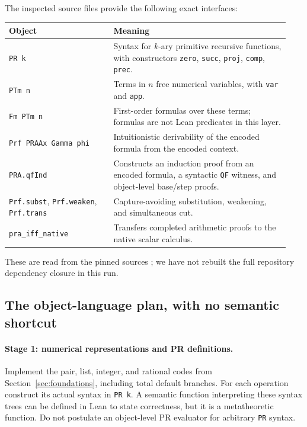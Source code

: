 The inspected source files provide the following exact interfaces:
\begin{longtable}{@{}>{\raggedright\arraybackslash}p{0.35\linewidth}>{\raggedright\arraybackslash}p{0.59\linewidth}@{}}
\toprule
Object & Meaning\\
\midrule
\endhead
\texttt{PR k} & Syntax for $k$-ary primitive recursive functions,
with constructors \texttt{zero}, \texttt{succ}, \texttt{proj},
\texttt{comp}, \texttt{prec}.\\
\texttt{PTm n} & Terms in $n$ free numerical variables, with
\texttt{var} and \texttt{app}.\\
\texttt{Fm PTm n} & First-order formulas over these terms; formulas
are not Lean predicates in this layer.\\
\texttt{Prf PRAAx Gamma phi} & Intuitionistic derivability of the
encoded formula from the encoded context.\\
\texttt{PRA.qfInd} & Constructs an induction proof from an encoded
formula, a syntactic \texttt{QF} witness, and object-level base/step proofs.\\
\texttt{Prf.subst}, \texttt{Prf.weaken}, \texttt{Prf.trans} &
Capture-avoiding substitution, weakening, and simultaneous cut.\\
\texttt{pra\_iff\_native} & Transfers completed arithmetic proofs to
the native scalar calculus.\\
\bottomrule
\end{longtable}
These are read from the pinned sources \cite{repo-pr,repo-deduction,repo-native};
we have not rebuilt the full repository dependency closure in this run.

\subsection{The object-language plan, with no semantic shortcut}

\paragraph{Stage 1: numerical representations and PR definitions.}
Implement the pair, list, integer, and rational codes from
Section~\ref{sec:foundations}, including total default branches. For each
operation construct its actual syntax in \texttt{PR k}. A semantic
function interpreting these syntax trees can be defined in Lean to state
correctness, but it is a metatheoretic function. Do not postulate an
object-level PR evaluator for arbitrary \texttt{PR} syntax.


